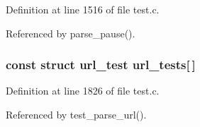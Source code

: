 Definition at line 1516 of file test.\+c.



Referenced by parse\+\_\+pause().

\subsubsection[{url\+\_\+tests}]{\setlength{\rightskip}{0pt plus 5cm}const struct {\bf url\+\_\+test} url\+\_\+tests[$\,$]}\label{test_8c_a8d5787817e4579adaab506928c9e2690}


Definition at line 1826 of file test.\+c.



Referenced by test\+\_\+parse\+\_\+url().

